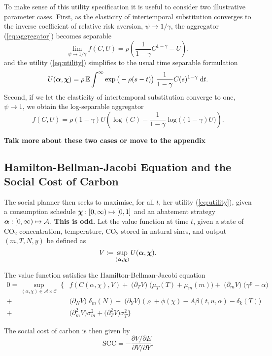 \documentclass[../../main.tex]{subfiles}
\begin{document}
To make sense of this utility specification it is useful to consider two illustrative parameter cases. First, as the elasticity of intertemporal substitution converges to the inverse  coefficient of relative risk aversion, $\psi \to 1 / \gamma$, the aggregator (\ref{eq:aggregator}) becomes separable \begin{equation}
    \lim_{\psi \to 1 / \gamma} f(C, U) = \rho \left(\frac{1}{1 - \gamma} C^{1 - \gamma} - U\right),
\end{equation} and the utility (\ref{eq:utility}) simplifies to the usual time separable formulation \begin{equation}
    U(\bm{\alpha}, \bm{\chi}) = \rho\operatorname{\mathbb{E}} \int^{\infty} \exp\big(-\rho (s - t) \big) \; \frac{1}{1 - \gamma} C(s)^{1 - \gamma} \; \mathrm{d}t.
\end{equation} Second, if we let the elasticity of intertemporal substitution converge to one, $\psi \to 1$, we obtain the log-separable aggregator \begin{equation}
    f(C, U) = \rho (1-  \gamma)U \left(\log(C) - \frac{1}{1 - \gamma} \log\big( (1 - \gamma) U \big) \right).
\end{equation}

\textbf{Talk more about these two cases or move to the appendix}

\subsection{Hamilton-Bellman-Jacobi Equation and the Social Cost of Carbon}

The social planner then seeks to maximise, for all $t$, her utility (\ref{eq:utility}), given a consumption schedule $\bm{\chi}: [0, \infty) \mapsto \mathcal [0, 1]$ and an abatement strategy $\bm{\alpha}: [0, \infty) \mapsto \mathcal{A}$. \textbf{This is odd.} Let the value function at time $t$, given a state of CO$_2$ concentration, temperature, CO$_2$ stored in natural sincs, and output $(m, T, N, y)$ be defined as \begin{equation}
    V \coloneqq \sup_{(\bm{\alpha}, \bm{\chi})} U(\bm{\alpha}, \bm{\chi}).
\end{equation}

\begin{proposition}
    The value function satisfies the Hamilton-Bellman-Jacobi equation \begin{equation}
        \begin{split}
            0 = \sup_{(\alpha, \chi) \in \mathcal{A} \times \mathcal{C}} \; \Bigg\{&f\left(C(\alpha, \chi), V\right) + \; \big(\partial_T V \big) \; \Big(\mu_T(T) + \mu_{m}(m) \Big) + \; \big(\partial_{m} V \big) \; \Big(\gamma^{\mathrm{p}} - \alpha \Big) \\
            + \; &\Big(\partial_{N} V\Big) \; \delta_m(N) + \; \Big(\partial_{Y} V \Big) \; \Big(\varrho + \phi(\chi) - A \beta(t, u, \alpha) - \delta_k(T) \Big) \\
            + \; &\Big(\partial^2_{m} V\Big) \sigma^2_m + \Big(\partial^2_{T} V\Big) \sigma^2_T  \Bigg\}
        \end{split}
    \end{equation}
\end{proposition}

The social cost of carbon is then given by \begin{equation}
    \text{SCC} = - \frac{\partial V / \partial E}{\partial V / \partial Y}. 
\end{equation}
\end{document}
